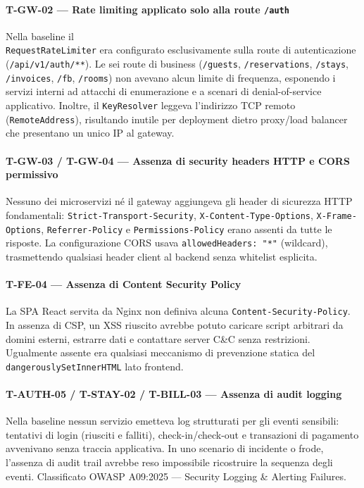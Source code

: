 ﻿\documentclass[a4paper,12pt]{report}
\begin{document}
\paragraph{T-GW-02 — Rate limiting applicato solo alla route \texttt{/auth}}
Nella baseline il \\ \texttt{RequestRateLimiter} era configurato esclusivamente sulla
route di autenticazione (\texttt{/api/v1/auth/**}). Le sei route di business
(\texttt{/guests}, \texttt{/reservations}, \texttt{/stays}, \texttt{/invoices},
\texttt{/fb}, \texttt{/rooms}) non avevano alcun limite di frequenza,
esponendo i servizi interni ad attacchi di enumerazione e a scenari di denial-of-service
applicativo. Inoltre, il \texttt{KeyResolver} leggeva l'indirizzo TCP remoto
(\texttt{RemoteAddress}), risultando inutile per deployment dietro proxy/load balancer
che presentano un unico IP al gateway.

\paragraph{T-GW-03 / T-GW-04 — Assenza di security headers HTTP e CORS permissivo}
Nessuno dei microservizi né il gateway aggiungeva gli header di sicurezza HTTP fondamentali:
\texttt{Strict-Transport-Security}, \texttt{X-Content-Type-Options},
\texttt{X-Frame-Options}, \texttt{Referrer-Policy} e \texttt{Permissions-Policy}
erano assenti da tutte le risposte. La configurazione CORS usava
\texttt{allowedHeaders: "*"} (wildcard), trasmettendo qualsiasi header client al backend
senza whitelist esplicita.

\paragraph{T-FE-04 — Assenza di Content Security Policy}
La SPA React servita da Nginx non definiva alcuna \texttt{Content-Security-Policy}.
In assenza di CSP, un XSS riuscito avrebbe potuto caricare script arbitrari da domini
esterni, estrarre dati e contattare server C\&C senza restrizioni. Ugualmente assente
era qualsiasi meccanismo di prevenzione statica del \texttt{dangerouslySetInnerHTML}
lato frontend.

\paragraph{T-AUTH-05 / T-STAY-02 / T-BILL-03 — Assenza di audit logging}
Nella baseline nessun servizio emetteva log strutturati per gli eventi sensibili:
tentativi di login (riusciti e falliti), check-in/check-out e transazioni di pagamento
avvenivano senza traccia applicativa. In uno scenario di incidente o frode, l'assenza
di audit trail avrebbe reso impossibile ricostruire la sequenza degli eventi.
Classificato OWASP A09:2025 --- Security Logging \& Alerting Failures.
\end{document}

